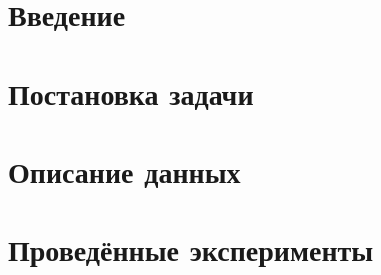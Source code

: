 \documentclass[a4paper,12pt]{article}
\begin{document}


\tableofcontents
\newpage

\section{ Введение }

\newpage
\section{ Постановка задачи }
\label{section:problem}

\section{ Описание данных }

\newpage
\section{ Проведённые эксперименты }
\label{section:experiments}

%
%


\newpage
{}
\printbibliography[title={Список использованных источников}]

%
\end{document}
